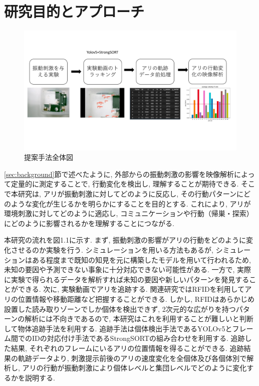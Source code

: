 ﻿\documentclass[a4paper, 12pt]{jsreport}
\begin{document}
\section{研究目的とアプローチ}
\label{sec:aim}
\begin{figure}[tbp]
\centering
\includegraphics[width=13cm,  keepaspectratio]{nagare.pdf}
\caption[Short figure caption for List of Figures]{提案手法全体図}
\label{fig:paper1_fig1}
\end{figure}
\ref{sec:background}節で述べたように, 外部からの振動刺激の影響を映像解析によって定量的に測定することで, 行動変化を検出し, 理解することが期待できる. そこで本研究は, アリが振動刺激に対してどのように反応し, その行動パターンにどのような変化が生じるかを明らかにすることを目的とする. これにより, アリが環境刺激に対してどのように適応し, コミュニケーションや行動（帰巣・探索）にどのように影響されるかを理解することにつながる. 

本研究の流れを図1.1に示す. まず, 振動刺激の影響がアリの行動をどのように変化させるのか実験を行う. シミュレーションを用いる方法もあるが, シミュレーションはある程度まで既知の知見を元に構築したモデルを用いて行われるため, 未知の要因や予測できない事象に十分対応できない可能性がある. 一方で, 実際に実験で得られるデータを解析すれば未知の要因や新しいパターンを発見することができる. 次に, 実験動画でアリを追跡する. 関連研究ではRFIDを利用してアリの位置情報や移動距離など把握することができる. しかし, RFIDはあらかじめ設置した読み取りゾーンでしか個体を検出できず, 2次元的な広がりを持つパターンの解析には不向きであるので, 本研究はこれを利用することが難しいと判断して物体追跡手法を利用する. 追跡手法は個体検出手法であるYOLOv5とフレーム間でのIDの対応付け手法であるStrongSORTの組み合わせを利用する. 追跡した結果, それぞれのフレームにいるアリの位置情報を得ることができる. 追跡結果の軌跡データより, 刺激提示前後のアリの速度変化を全個体及び各個体別で解析し, アリの行動が振動刺激により個体レベルと集団レベルでどのように変化するかを説明する. 
\end{document}
